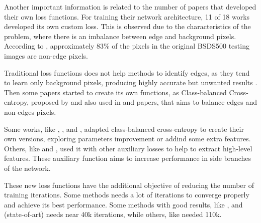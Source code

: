 Another important information is related to the number of papers that developed their own loss functions.
For training their network architecture, 11 of 18 works developed its own custom loss.
This is observed due to the characteristics of the problem, where there is an imbalance between edge and background pixels.
According to \cite{ReExtraction:Wen201884}, approximately 83\% of the pixels in the original BSDS500 testing images are non-edge pixels.

Traditional loss functions does not help methods to identify edges, as they tend to learn only background pixels, producing highly accurate but unwanted results \cite{HED:2015}.
Then some papers started to create its own functions, as Class-balanced Cross-entropy, proposed by \cite{HED:2015} and also used in \cite{Cumulative:Song20181847} and \cite{CrispBoundaries:2018:Deng2018570} papers, that aims to balance edges and non-edges pixels.

Some works, like \cite{Kokkinos:2016}, \cite{COB:2018:7917294}, \cite{RCF:2019} and \cite{ReExtraction:Wen201884}, adapted class-balanced cross-entropy to create their own versions, exploring parameters improvement or addind some extra features.
Others, like \cite{LearningHybrid:Hu2018377} and \cite{He:2019}, used it with other auxiliary losses to help to extract high-level features.
These auxiliary function aims to increase performance in side branches of the network.

These new loss functions have the additional objective of reducing the number of training iterations.
Some methods needs a lot of iterations to converge properly and achieve its best performance.
Some methods with good results, like \cite{RCF:2019}, \cite{Yang:2019} and \cite{He:2019} (state-of-art) needs near 40k iterations, while others, like \cite{ProeminentEdge:2018:Cai2018} needed 110k.

% 

